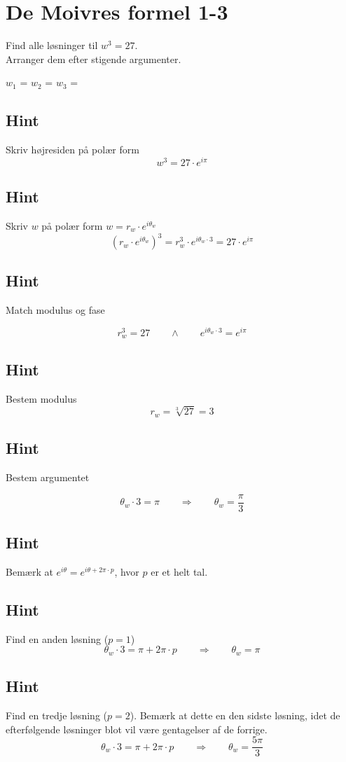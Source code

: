 \documentclass{article}
\newenvironment{exercise}[1]{\newpage\section{#1}}{}
\newcommand{\answerbox}[1]{\fbox{$#1$}}
\newcommand{\hint}{\subsection*{Hint}}
\begin{document}
\begin{exercise}{De Moivres formel 1-3}
	
	Find alle løsninger til $w^3=27$. \\
	Arranger dem efter stigende argumenter.
	
	$w_1$ = \answerbox{3 \cdot e^{i \frac{\pi}{3}}}		$w_2$ = \answerbox{3 \cdot e^{i \pi}}		$w_3$ = \answerbox{3 \cdot e^{i \frac{5 \pi}{3}}}	
	
	
	\hint 
	
	Skriv højresiden på polær form
	\[
	w^3 = 27 \cdot e^{i \pi}
	\]
	
	
	\hint
	
	Skriv $w$ på polær form $w = r_w \cdot e^{i \theta_w}$
	\[
	\left(r_w \cdot e^{i \theta_w}\right)^3 = r_w^3 \cdot e^{i \theta_w \cdot 3} = 27 \cdot e^{i \pi}
	\]
	
	\hint 
	Match modulus og fase
	
	\[
	r_w^3 = 27 \qquad \wedge \qquad e^{i \theta_w \cdot 3} = e^{i \pi}
	\]
	
	\hint
	
	Bestem modulus
	\[
	r_w  =  \sqrt[3]{27} = 3
	\]
	
	\hint
	
	Bestem argumentet
	
	\[
	\theta_w \cdot 3 = \pi \qquad \Rightarrow \qquad  \theta_w = \frac{\pi}{3}
	\]
	
	\hint
	
	Bemærk at $e^{i \theta} = e^{i \theta + 2 \pi \cdot p}$, hvor $p$ er et helt tal.
	
	\hint
	
	Find en anden løsning ($p=1$)
	\[
	\theta_w \cdot 3 = \pi  + 2 \pi \cdot p \qquad \Rightarrow \qquad  \theta_w = \pi
	\]
	
	\hint
	
	Find en tredje løsning ($p=2$). Bemærk at dette en den sidste løsning, idet de efterfølgende løsninger blot vil være gentagelser af de forrige.
	\[
	\theta_w \cdot 3 = \pi  + 2 \pi \cdot p \qquad \Rightarrow  \qquad  \theta_w = \frac{5 \pi}{3}
	\]
	
	
\end{exercise}

\newpage
\end{document}
